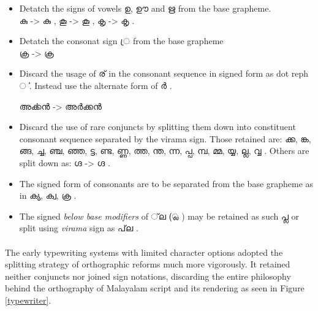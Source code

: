 \documentclass[10pt]{article}
\begin{document}
\begin{itemize}
\item
Detatch the signs of vowels \begingroup \manjari ഉ, ഊ and  ഋ \endgroup from the base grapheme.\\
\begingroup \manjari കു  \endgroup -> \begingroup \raghu കു  \endgroup ,
\begingroup \manjari കൂ  \endgroup -> \begingroup \raghu  കൂ  \endgroup ,
\begingroup \manjari കൃ  \endgroup -> \begingroup \raghu കൃ  \endgroup .

\item 
Detatch the consonat sign \begingroup \manjari   ്ര  \endgroup from the base grapheme \\
\begingroup \manjari ക്ര   \endgroup -> \begingroup \raghu ക്ര   \endgroup 

\item
Discard the usage of  \begingroup \manjari ര് \endgroup in the  consonant sequence  in signed form as dot reph  \begingroup \manjari ൎ  \endgroup. Instead use the alternate form of  \begingroup \manjari ർ \endgroup.

 \begingroup \manjari അൎക്കൻ \endgroup ->  \begingroup \manjari അർക്കൻ  \endgroup

\item
Discard the use of rare conjuncts by splitting them down into constituent consonant sequence separated by the virama sign. Those retained are:  \begingroup \manjari ക്ക, ങ്ക, ങ്ങ, ച്ച, ഞ്ച, ഞ്ഞ, ട്ട, ണ്ട, ണ്ണ, ത്ത, ന്ത, ന്ന, പ്പ, മ്പ, മ്മ, യ്യ, ല്ല, വ്വ \endgroup. Others are split down as: \begingroup \manjari ഗ്ദ \endgroup -> \begingroup \raghu  ഗ്ദ  \endgroup. 

\item
The signed form of consonants are to be separated from the base grapheme as in \begingroup \raghu ക്യ, ക്വ, ക്ര  \endgroup.

\item
The signed \textit{below base modifiers}  of \begingroup \manjari   ്‌ല   (്ല )   \endgroup may be retained as such \begingroup \manjari പ്ല \endgroup or split using \textit{virama} sign as \begingroup \manjari   പ്‌ല  \endgroup.

\end{itemize}

\paragraph{}
The early typewriting systems  with limited character options adopted the splitting strategy of orthographic reforms much more vigorously. It retained neither conjuncts nor joined sign notations, discarding the entire philosophy behind the orthography of Malayalam script and its rendering as seen in Figure \ref{typewriter}.
\end{document}
